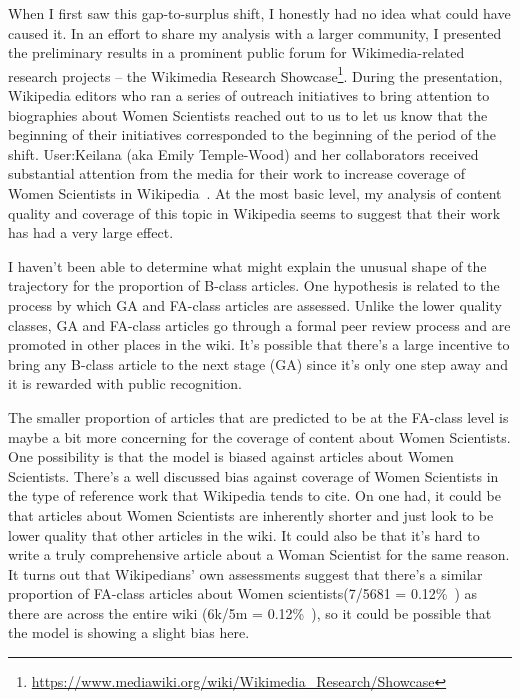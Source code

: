 When I first saw this gap-to-surplus shift, I honestly had no idea what could have caused it.  In an effort to share my analysis with a larger community, I presented the preliminary results in a prominent public forum for Wikimedia-related research projects -- the Wikimedia Research Showcase\footnote{\url{https://www.mediawiki.org/wiki/Wikimedia_Research/Showcase}}.  During the presentation, Wikipedia editors who ran a series of outreach initiatives to bring attention to biographies about Women Scientists reached out to us to let us know that the beginning of their initiatives corresponded to the beginning of the period of the shift.  User:Keilana (aka Emily Temple-Wood) and her collaborators received substantial attention from the media for their work to increase coverage of Women Scientists in Wikipedia~\cite{change13emily}.  At the most basic level, my analysis of content quality and coverage of this topic in Wikipedia seems to suggest that their work has had a very large effect.

I haven't been able to determine what might explain the unusual shape of the trajectory for the proportion of B-class articles.  One hypothesis is related to the process by which GA and FA-class articles are assessed.  Unlike the lower quality classes, GA and FA-class articles go through a formal peer review process and are promoted in other places in the wiki.  It's possible that there's a large incentive to bring any B-class article to the next stage (GA) since it's only one step away and it is rewarded with public recognition.

The smaller proportion of articles that are predicted to be at the FA-class level is maybe a bit more concerning for the coverage of content about Women Scientists.  One possibility is that the model is biased against articles about Women Scientists.  There's a well discussed bias against coverage of Women Scientists in the type of reference work that Wikipedia tends to cite.  On one had, it could be that articles about Women Scientists are inherently shorter and just look to be lower quality that other articles in the wiki.  It could also be that it's hard to write a truly comprehensive article about a Woman Scientist for the same reason.  It turns out that Wikipedians' own assessments suggest that there's a similar proportion of FA-class articles about Women scientists(7/5681 = 0.12\%~\cite{womenscientist_stats}) as there are across the entire wiki (6k/5m = 0.12\%~\cite{wikipedia1.0stats}), so it could be possible that the model is showing a slight bias here.
